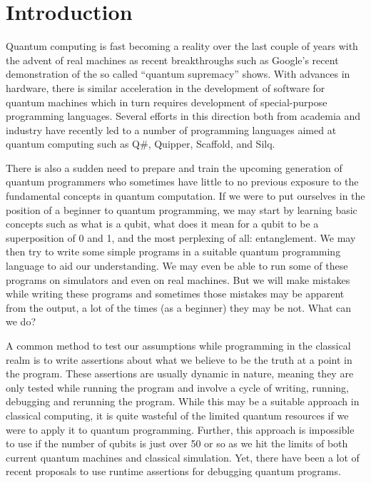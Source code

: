 \documentclass[adraft,creativecommons]{eptcs}
\title{\titlerunning}
\author{
\authorrunning
\institute{University of Chicago}
\email{\mailtodomain{ks@cs.uchicago.edu}}
}
\begin{document}
\maketitle

\begin{abstract}
    \blindtext
\end{abstract}

\thispagestyle{empty}

\tableofcontents

\listoffigures

\lstlistoflistings



\section{Introduction}

Quantum computing is fast becoming a reality over the last couple of years with the advent of real machines as recent breakthroughs such as Google's recent demonstration of the so called ``quantum supremacy'' shows. With advances in hardware, there is similar acceleration in the development of software for quantum machines which in turn requires development of special-purpose programming languages. Several efforts in this direction both from academia and industry have recently led to a number of programming languages aimed at quantum computing such as Q\#, Quipper, Scaffold, and Silq.

There is also a sudden need to prepare and train the upcoming generation of quantum programmers who sometimes have little to no previous exposure to the fundamental concepts in quantum computation. If we were to put ourselves in the position of a beginner to quantum programming, we may start by learning basic concepts such as what is a qubit, what does it mean for a qubit to be a superposition of 0 and 1, and the most perplexing of all: entanglement. We may then try to write some simple programs in a suitable quantum programming language to aid our understanding. We may even be able to run some of these programs on simulators and even on real machines. But we will make mistakes while writing these programs and sometimes those mistakes may be apparent from the output, a lot of the times (as a beginner) they may be not. What can we do?

A common method to test our assumptions while programming in the classical realm is to write assertions about what we believe to be the truth at a point in the program. These assertions are usually dynamic in nature, meaning they are only tested while running the program and involve a cycle of writing, running, debugging and rerunning the program. While this may be a suitable approach in classical computing, it is quite wasteful of the limited quantum resources if we were to apply it to quantum programming. Further, this approach is impossible to use if the number of qubits is just over 50 or so as we hit the limits of both current quantum machines and classical simulation. Yet, there have been a lot of recent proposals to use runtime assertions for debugging quantum programs.
\end{document}

